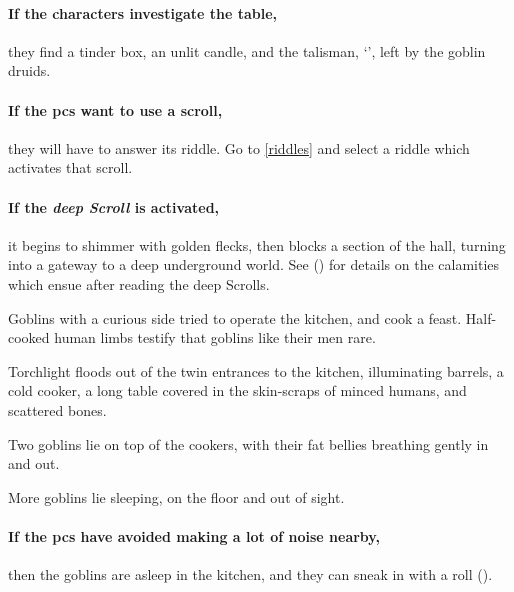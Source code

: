 \paragraph{If the characters investigate the table,}
they find a tinder box, an unlit candle, and the \gls{talisman}, `\lootTalisman', left by the goblin druids.

\showTalisman

\labyrinthScroll

\showTalisman

\paragraph{If the \glspl{pc} want to use a scroll,}
they will have to answer its riddle.
Go to \autoref{riddles} and select a riddle which activates that scroll.

\paragraph{If the \textit{\Gls{deep} Scroll} is activated,}
it begins to shimmer with golden flecks, then blocks a section of the hall, turning into a gateway to a deep underground world.
See  () for details on the calamities which ensue after reading the \Gls{deep} Scrolls.


\begin{exampletext}
  Goblins with a curious side tried to operate the kitchen, and cook a feast.
  Half-cooked human limbs testify that goblins like their men rare.
\end{exampletext}

\begin{boxtext}
  Torchlight floods out of the twin entrances to the kitchen, illuminating barrels, a cold cooker, a long table covered in the skin-scraps of minced humans, and scattered bones.

  Two goblins lie on top of the cookers, with their fat bellies breathing gently in and out.
\end{boxtext}

More goblins lie sleeping, on the floor and out of sight.

\paragraph{If the \glspl{pc} have avoided making a lot of noise nearby,}
then the goblins are asleep in the kitchen, and they can sneak in with a  roll (\tn[8]).%

